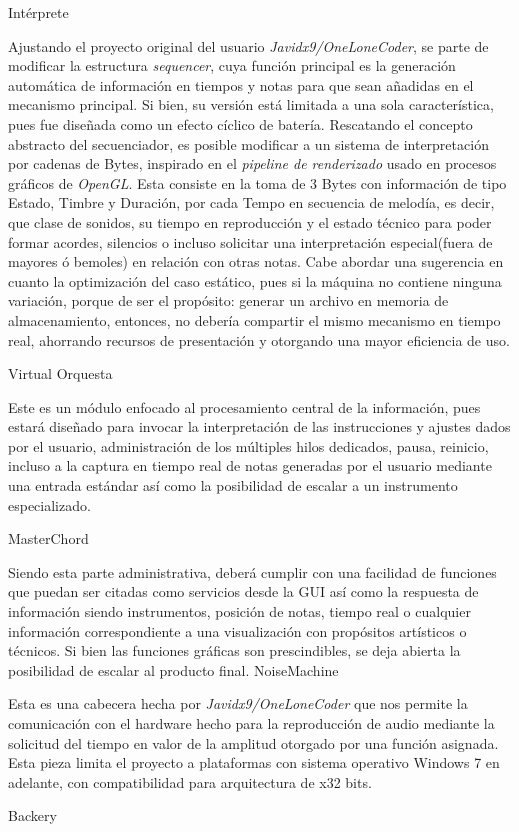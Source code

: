 \documentclass{book}
\begin{document}
	{\normalsize Intérprete}\par
	Ajustando el proyecto original del usuario \emph{Javidx9/OneLoneCoder}, se parte de modificar la estructura \emph{sequencer}, cuya función principal es la generación automática de información en tiempos y notas para que sean añadidas en el mecanismo principal. Si bien, su versión está limitada a una sola característica, pues fue diseñada como un efecto cíclico de batería. Rescatando el concepto abstracto del secuenciador, es posible modificar a un sistema de interpretación por cadenas de Bytes, inspirado en el \emph{pipeline de renderizado} usado en procesos gráficos de \emph{OpenGL}. Esta consiste en la toma de 3 Bytes con información de tipo Estado, Timbre y Duración, por cada Tempo en secuencia de melodía, es decir, que clase de sonidos, su tiempo en reproducción y el estado técnico para poder formar acordes, silencios o incluso solicitar una interpretación especial(fuera de mayores ó bemoles) en relación con otras notas. Cabe abordar una sugerencia en cuanto la optimización del caso estático, pues si la máquina no contiene ninguna variación, porque de ser el propósito: generar un archivo en memoria de almacenamiento, entonces, no debería compartir el mismo mecanismo en tiempo real, ahorrando recursos de presentación y otorgando una mayor eficiencia de uso.\par\pagebreak
	
	{\large Virtual Orquesta}\par
	Este es un módulo enfocado al procesamiento central de la información, pues estará diseñado para invocar la interpretación de las instrucciones y ajustes dados por el usuario, administración de los múltiples hilos dedicados, pausa, reinicio, incluso a la captura en tiempo real de notas generadas por el usuario mediante una entrada estándar así como la posibilidad de escalar a un instrumento especializado.\par
	{\normalsize MasterChord}\par
	Siendo esta parte administrativa, deberá cumplir con una facilidad de funciones que puedan ser citadas como servicios desde la GUI así como la respuesta de información siendo instrumentos, posición de notas, tiempo real o cualquier información correspondiente a una visualización con propósitos artísticos o técnicos. Si bien las funciones gráficas son prescindibles, se deja abierta la posibilidad de escalar al producto final.
	{\normalsize NoiseMachine}\par
	Esta es una cabecera hecha por \emph{Javidx9/OneLoneCoder} que nos permite la comunicación con el hardware hecho para la reproducción de audio mediante la solicitud del tiempo en valor de la amplitud otorgado por una función asignada. Esta pieza limita el proyecto a plataformas con sistema operativo Windows 7 en adelante, con compatibilidad para arquitectura de x32 bits.\par
	{\large Backery}\par
	
\end{document}
